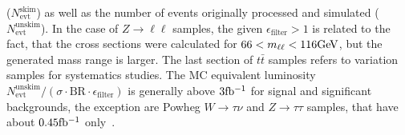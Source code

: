 \begin{table}[htbp]
\begin{center}
{    			($N^\mathrm{skim}_\mathrm{evt}$) as well as the number of events
    			originally processed and simulated
    			($N^\mathrm{unskim}_\mathrm{evt}$). In the case of
    			$Z\to\ell\ell$ samples, the given $\epsilon_\mathrm{filter} > 1$
    			is related to the fact, that the cross sections were calculated
    			for $66 <m_{\ell\ell} <116\text{Ge\kern -0.1em V}$, but the generated mass range is
    			larger. The last section of $t\bar{t}$ samples refers to
    			variation samples for systematics studies. The MC equivalent
    			luminosity
    			$N^\mathrm{unskim}_\mathrm{evt}/(\sigma{\cdot}\text{BR}{\cdot}\epsilon_\mathrm{filter})$
    			is generally above $3\mbox{fb\(^{-1}\)}$ for signal and significant
    			backgrounds, the exception are Powheg $W\to\tau\nu$ and
    			$Z\to\tau\tau$ samples, that have about $0.45\mbox{fb\(^{-1}\)}$ only~\cite{int_note_samples}.}
    		\label{tab:samples13}
    	\end{center}
    \end{table}
    
